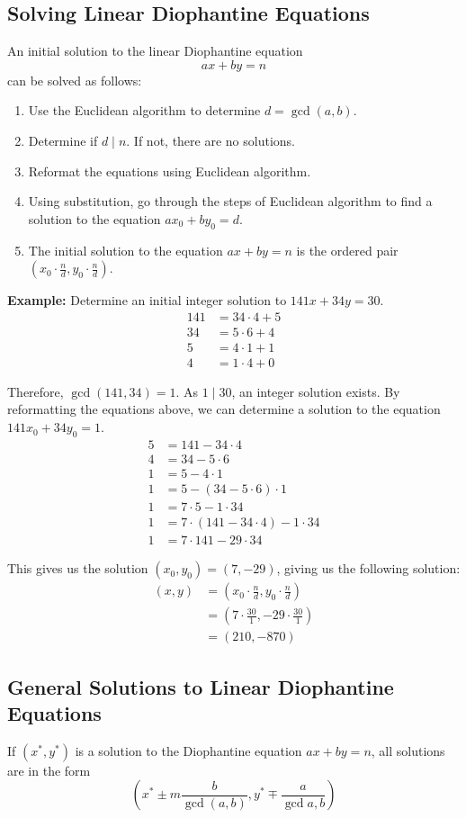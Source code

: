 \documentclass[12pt]{article}
\newcommand{\tdiv}{\; | \;}
\begin{document}
\subsection{Solving Linear Diophantine Equations}
An initial solution to the linear Diophantine equation $$ax + by = n$$ can be solved as follows:
\begin{enumerate}
    \item Use the Euclidean algorithm to determine $d = \gcd{(a, b)}$.
    \item Determine if $d \tdiv n$. If not, there are no solutions.
    \item Reformat the equations using Euclidean algorithm.
    \item Using substitution, go through the steps of Euclidean algorithm to find a solution to the equation $ax_0 + by_0 = d$.
    \item The initial solution to the equation $ax + by = n$ is the ordered pair $(x_0 \cdot \frac{n}{d}, y_0 \cdot \frac{n}{d})$.
\end{enumerate}

\textbf{Example:} Determine an initial integer solution to $141x + 34y = 30$.
\begin{align*}
    141 &= 34 \cdot 4 + 5 \\
    34 &= 5 \cdot 6 + 4 \\
    5 &= 4 \cdot 1 + 1 \\
    4 &= 1 \cdot 4 + 0
\end{align*}

Therefore, $\gcd{(141, 34)} = 1$. As $1\tdiv 30$, an integer solution exists. By reformatting the equations above, we can determine a solution to the equation $141x_0 + 34y_0 = 1$.
\begin{align*}
    5 &= 141 - 34 \cdot 4 \\
    4 &= 34 - 5 \cdot 6 \\
    1 &= 5 - 4 \cdot 1 \\
    1 &= 5 - (34 - 5 \cdot 6) \cdot 1 \\
    1 &= 7 \cdot 5 - 1 \cdot 34 \\
    1 &= 7 \cdot (141 - 34 \cdot 4) - 1 \cdot 34 \\
    1 &= 7 \cdot 141 - 29 \cdot 34
\end{align*}

This gives us the solution $(x_0, y_0) = (7, -29)$, giving us the following solution:
\begin{align*}
    (x, y) &= (x_0 \cdot \frac{n}{d}, y_0 \cdot \frac{n}{d}) \\
    &= (7 \cdot \frac{30}{1}, -29 \cdot \frac{30}{1}) \\
    &= (210, -870)
\end{align*}

\subsection{General Solutions to Linear Diophantine Equations}
If $(x^{*}, y^{*})$ is a solution to the Diophantine equation $ax + by = n$, all solutions are in the form $$(x^{*} \pm m \frac{b}{\gcd{(a, b)}}, y^{*} \mp \frac{a}{\gcd{a, b}})$$
\end{document}

